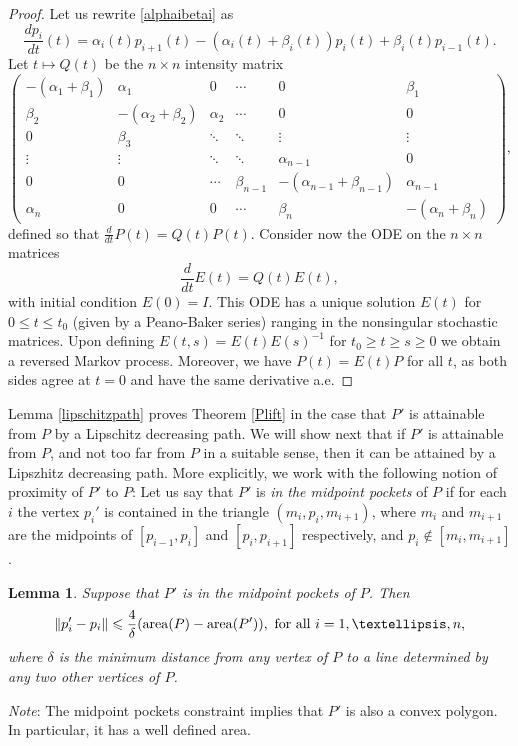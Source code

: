 \documentclass[11pt]{amsart}
\newtheorem{lemma}[theorem]{Lemma}
\theoremstyle{remark}
\numberwithin{equation}{section}
\newcommand{\area}{\mathrm{area}}
\renewcommand{\leq}{\leqslant}
\renewcommand{\geq}{\geqslant}
\renewcommand{\le}{\leqslant}
\begin{document}
\begin{proof}
Let us rewrite \eqref{alphaibetai} as
\[
\frac{dp_i}{dt}(t)=\alpha_{i}(t)p_{i+1}(t) -(\alpha_i(t)+\beta_i(t))p_i(t)+\beta_i(t)p_{i-1}(t).
\]
Let $t\mapsto Q(t)$ be the $n\times n$ intensity  matrix 
\[
\begin{pmatrix}
-(\alpha_1+\beta_1) & \alpha_1 & 0 & \cdots & 0 & \beta_1 \\[6pt]
\beta_2 & -(\alpha_2+\beta_2) & \alpha_2 & \cdots & 0 & 0 \\[6pt]
0 & \beta_3 & \ddots & \ddots & \vdots & \vdots \\[6pt]
\vdots & \vdots & \ddots & \ddots & \alpha_{n-1} & 0 \\[6pt]
0 & 0 & \cdots & \beta_{n-1} & -(\alpha_{n-1}+\beta_{n-1}) & \alpha_{n-1} \\[6pt]
\alpha_n & 0 & 0 & \cdots & \beta_n & -(\alpha_n+\beta_n)
\end{pmatrix},
\]
defined so that  $\frac{d}{dt} P(t)=Q(t)P(t)$. 
Consider now the ODE on the $n\times n$ matrices
\[
\frac{d}{dt} E(t)=Q(t)E(t),
\]
with initial condition $E(0)=I$. This ODE has a unique solution $E(t)$ for $0\le t\le t_0$ (given by a Peano-Baker series) ranging in the nonsingular stochastic matrices. Upon defining 
$E(t,s)=E(t)E(s)^{-1}$ for $t_0\geq t\geq s\geq 0$ we obtain a reversed Markov process. Moreover, we have $P(t)=E(t)P$ for all $t$,  as both sides agree at $t=0$ and have the same derivative a.e.
\end{proof}

Lemma \ref{lipschitzpath} proves Theorem \ref{Plift} in the case that $P'$ is attainable from $P$ by a Lipschitz decreasing path. We will show next that if $P'$ is attainable from $P$, and not too far  from $P$ in a suitable sense, then it can be attained by a Lipszhitz decreasing path.
More explicitly, 
we work with the following notion of proximity of $P'$ to $P$: Let us say that $P'$ is \emph{in the midpoint pockets} of $P$ if for each $i$ the vertex $p_i'$ is contained in the triangle $(m_i,p_i,m_{i+1})$, where $m_i$ and $m_{i+1}$ are the midpoints of $[p_{i-1},p_i]$ and $[p_i,p_{i+1}]$ respectively, and $p_i\notin [m_i,m_{i+1}]$. 



\begin{lemma}\label{midpointpockets}
Suppose that $P'$ is in the midpoint pockets of $P$. Then 
\[
\|p_i'-p_i\|\leq \frac4{\delta}(\area(P)-\area(P')),\hbox{ for all }i=1,\ldots,n,
\]
where $\delta$ is the minimum distance from any vertex of $P$ to a line determined by any two other vertices of $P$.
\end{lemma}
\emph{Note}: The midpoint pockets constraint implies that $P'$ is also a convex polygon. In particular, it has a well defined area. 
\end{document}
